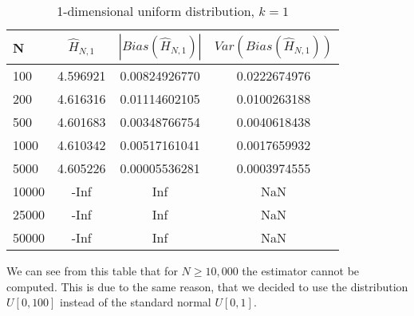 \documentclass{article}
\begin{document}
\begin{table}
\caption{1-dimensional uniform distribution, $k=1$} \label{uniform_k=1_table}
\begin{center}
\begin{tabular}{| l | c c c|} 
\toprule
N & $\hat{H}_{N, 1}$ & $|Bias(\hat{H}_{N, 1})|$ & $Var(Bias(\hat{H}_{N, 1}))$ \\
\midrule[1pt]
100     & 4.596921     & 0.00824926770     & 0.0222674976  \\
200     & 4.616316     & 0.01114602105     & 0.0100263188  \\
500     & 4.601683     & 0.00348766754     & 0.0040618438  \\
1000    & 4.610342     & 0.00517161041     & 0.0017659932  \\
5000    & 4.605226     & 0.00005536281     & 0.0003974555  \\
10000   &     -Inf     &           Inf     &          NaN  \\
25000   &     -Inf     &           Inf     &          NaN  \\
50000   &     -Inf     &           Inf     &          NaN  \\
\hline
\end{tabular}
\end{center}
\end{table}

We can see from this table that for $N \geq 10,000$ the estimator cannot be computed. This is due to the same reason, that we decided to use the distribution $U[0,100]$ instead of the standard normal $U[0,1]$.
\end{document}

